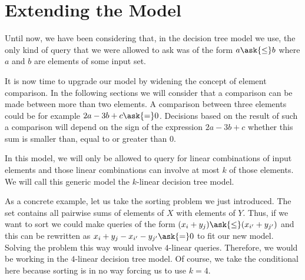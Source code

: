 \section{Extending the Model}

Until now, we have been considering that, in the decision tree
model we use, the only kind of query that we were allowed to ask was of the
form \(a \ask{\le} b \) where \(a\) and \(b\) are elements of some input set.

It is now time to upgrade our model by widening the concept of element
comparison. In the following sections we will consider that a comparison can
be made between more than two elements. A comparison between three
elements could be for example \(2a - 3b + c \ask{=} 0\). Decisions based on the
result of such a comparison will depend on the sign of the expression
\(2a - 3b + c\) \ie whether this sum is smaller than, equal to or greater than
\(0\).

In this model, we will only be allowed to query for linear combinations of
input elements and those linear combinations can involve at most \(k\) of those
elements. We will call this generic model the \(k\)-linear decision tree model.

As a concrete example, let us take the sorting \XY problem we just introduced.
The set \XY contains all pairwise sums of elements of \(X\) with elements of
\(Y\). Thus, if we want to sort \XY we could make queries of the form \((x_i +
y_j) \ask{\le} (x_{i'} + y_{j'})\) and this can be rewritten as \( x_i +
y_j - x_{i'} - y_{j'} \ask{=} 0\) to fit our new model. Solving the problem
this way would involve \(4\)-linear queries. Therefore, we would be working in
the \(4\)-linear decision tree model. Of course, we take the conditional here
because sorting \XY is in no way forcing us to use \(k=4\).
